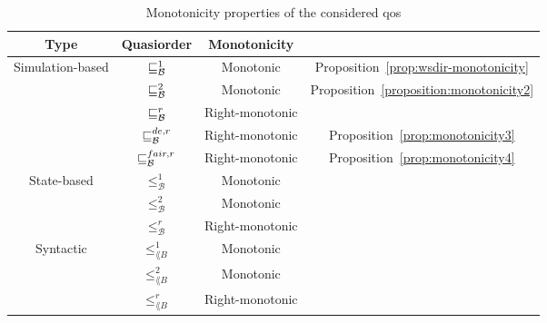 \begin{table}[h]
\centering
\begin{tabular}{ c | c | c | c  }
    \textbf{Type} & \textbf{Quasiorder} & \textbf{Monotonicity} & \\
    \hline
    \hline
    Simulation-based & $\sqsubseteq^1_{\mathcal{B}}$  & Monotonic & Proposition~\ref{prop:wsdir-monotonicity} \\
    & $\sqsubseteq_{\mathcal{B}}^{2}$  & Monotonic & Proposition~\ref{proposition:monotonicity2}\\
    & $\sqsubseteq_{\mathcal{B}}^r$  & Right-monotonic & \cite{ganty2019language}\\
    & $\sqsubseteq_{\mathcal{B}}^{de,r}$  & Right-monotonic & Proposition~\ref{prop:monotonicity3}\\
    & $\sqsubseteq_{\mathcal{B}}^{fair,r}$  & Right-monotonic & Proposition~\ref{prop:monotonicity4}\\
    \hline
    State-based & $\leq_{\mathcal{B}}^1$ & Monotonic & \cite{ganty2020omegalang} \\
    & $\leq_{\mathcal{B}}^2$ & Monotonic & \cite{ganty2020omegalang} \\
    & $\leq_{\mathcal{B}}^r$ & Right-monotonic & \cite{ganty2020omegalang} \\
    \hline
    Syntactic & $\leq_{\lang{B}}^1$ & Monotonic & \cite{ganty2020omegalang} \\
    & $\leq_{\lang{B}}^2$ & Monotonic & \cite{ganty2020omegalang} \\
    & $\leq_{\lang{B}}^r$ & Right-monotonic & \cite{ganty2020omegalang} \\
    \end{tabular}
\caption{Monotonicity properties of the considered qos}
\label{table:wqos-monotonicity}
\end{table}

